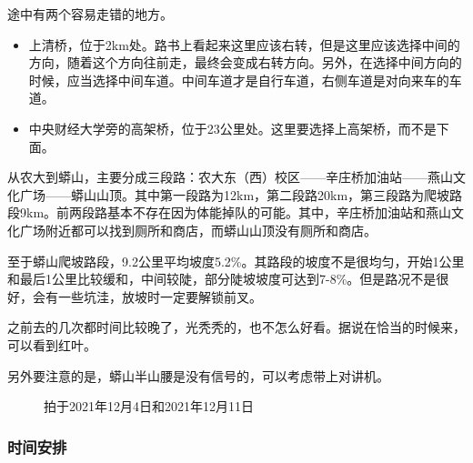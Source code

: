 \documentclass{ctexbook}
\begin{document}
途中有两个容易走错的地方。
\begin{itemize}
    \item 上清桥，位于2km处。路书上看起来这里应该右转，但是这里应该选择中间的方向，随着这个方向往前走，最终会变成右转方向。另外，在选择中间方向的时候，应当选择中间车道。中间车道才是自行车道，右侧车道是对向来车的车道。
    \item 中央财经大学旁的高架桥，位于23公里处。这里要选择上高架桥，而不是下面。
\end{itemize}

从农大到蟒山，主要分成三段路：农大东（西）校区——辛庄桥加油站——燕山文化广场——蟒山山顶。其中第一段路为12km，第二段路20km，第三段路为爬坡路段9km。前两段路基本不存在因为体能掉队的可能。其中，辛庄桥加油站和燕山文化广场附近都可以找到厕所和商店，而蟒山山顶没有厕所和商店。

至于蟒山爬坡路段，9.2公里平均坡度5.2\%。其路段的坡度不是很均匀，开始1公里和最后1公里比较缓和，中间较陡，部分陡坡坡度可达到7-8\%。但是路况不是很好，会有一些坑洼，放坡时一定要解锁前叉。

之前去的几次都时间比较晚了，光秃秃的，也不怎么好看。据说在恰当的时候来，可以看到红叶。

另外要注意的是，蟒山半山腰是没有信号的，可以考虑带上对讲机。
\begin{figure}[!htb]
    \centering
       \quad 
        \caption{拍于2021年12月4日和2021年12月11日}
  \end{figure}
\subsubsection{时间安排}
\end{document}
